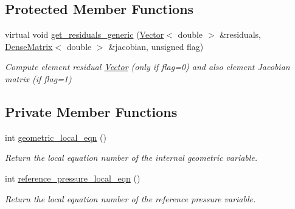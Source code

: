 \subsection*{Protected Member Functions}
\begin{DoxyCompactItemize}
\item 
virtual void \hyperlink{classoomph_1_1PseudoBucklingRingElement_a6cde480f22d2a89a9322b172028eb8a9}{get\+\_\+residuals\+\_\+generic} (\hyperlink{classoomph_1_1Vector}{Vector}$<$ double $>$ \&residuals, \hyperlink{classoomph_1_1DenseMatrix}{Dense\+Matrix}$<$ double $>$ \&jacobian, unsigned flag)
\begin{DoxyCompactList}\small\item\em Compute element residual \hyperlink{classoomph_1_1Vector}{Vector} (only if flag=0) and also element Jacobian matrix (if flag=1) \end{DoxyCompactList}\end{DoxyCompactItemize}
\subsection*{Private Member Functions}
\begin{DoxyCompactItemize}
\item 
int \hyperlink{classoomph_1_1PseudoBucklingRingElement_a6fb8adff1f70ef56802e4efbb1860a99}{geometric\+\_\+local\+\_\+eqn} ()
\begin{DoxyCompactList}\small\item\em Return the local equation number of the internal geometric variable. \end{DoxyCompactList}\item 
int \hyperlink{classoomph_1_1PseudoBucklingRingElement_a4e3f180b2cb5a3f7992e3f1bfff488bb}{reference\+\_\+pressure\+\_\+local\+\_\+eqn} ()
\begin{DoxyCompactList}\small\item\em Return the local equation number of the reference pressure variable. \end{DoxyCompactList}\end{DoxyCompactItemize}
